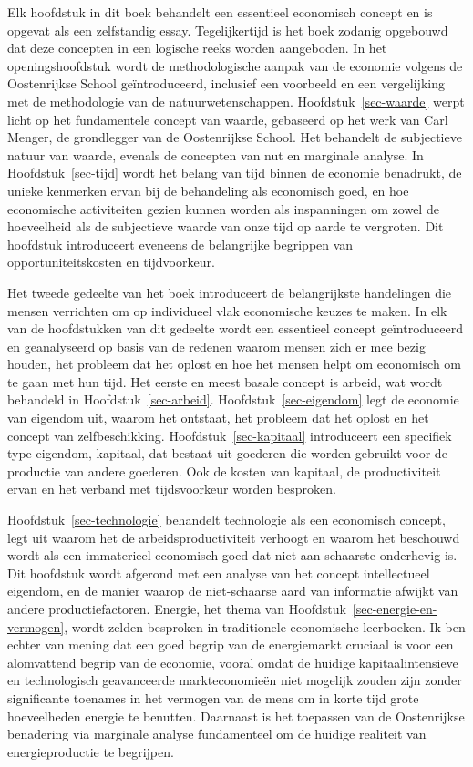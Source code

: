 \documentclass[
  a5paper,
  smalldemyvopaper,11pt,twoside,onecolumn,openright,extrafontsizes,
hidelinks]{memoir}
\begin{document}
Elk hoofdstuk in dit boek behandelt een essentieel economisch concept en
is opgevat als een zelfstandig essay. Tegelijkertijd is het boek zodanig
opgebouwd dat deze concepten in een logische reeks worden aangeboden. In
het openingshoofdstuk wordt de methodologische aanpak van de economie
volgens de Oostenrijkse School geïntroduceerd, inclusief een voorbeeld
en een vergelijking met de methodologie van de natuurwetenschappen.
Hoofdstuk~\ref{sec-waarde} werpt licht op het fundamentele concept van
waarde, gebaseerd op het werk van Carl Menger, de grondlegger van de
Oostenrijkse School. Het behandelt de subjectieve natuur van waarde,
evenals de concepten van nut en marginale analyse. In
Hoofdstuk~\ref{sec-tijd} wordt het belang van tijd binnen de economie
benadrukt, de unieke kenmerken ervan bij de behandeling als economisch
goed, en hoe economische activiteiten gezien kunnen worden als
inspanningen om zowel de hoeveelheid als de subjectieve waarde van onze
tijd op aarde te vergroten. Dit hoofdstuk introduceert eveneens de
belangrijke begrippen van opportuniteitskosten en tijdvoorkeur.

Het tweede gedeelte van het boek introduceert de belangrijkste
handelingen die mensen verrichten om op individueel vlak economische
keuzes te maken. In elk van de hoofdstukken van dit gedeelte wordt een
essentieel concept geïntroduceerd en geanalyseerd op basis van de
redenen waarom mensen zich er mee bezig houden, het probleem dat het
oplost en hoe het mensen helpt om economisch om te gaan met hun tijd.
Het eerste en meest basale concept is arbeid, wat wordt behandeld in
Hoofdstuk~\ref{sec-arbeid}. Hoofdstuk~\ref{sec-eigendom} legt de
economie van eigendom uit, waarom het ontstaat, het probleem dat het
oplost en het concept van zelfbeschikking. Hoofdstuk~\ref{sec-kapitaal}
introduceert een specifiek type eigendom, kapitaal, dat bestaat uit
goederen die worden gebruikt voor de productie van andere goederen. Ook
de kosten van kapitaal, de productiviteit ervan en het verband met
tijdsvoorkeur worden besproken.

Hoofdstuk~\ref{sec-technologie} behandelt technologie als een economisch
concept, legt uit waarom het de arbeidsproductiviteit verhoogt en waarom
het beschouwd wordt als een immaterieel economisch goed dat niet aan
schaarste onderhevig is. Dit hoofdstuk wordt afgerond met een analyse
van het concept intellectueel eigendom, en de manier waarop de
niet-schaarse aard van informatie afwijkt van andere productiefactoren.
Energie, het thema van Hoofdstuk~\ref{sec-energie-en-vermogen}, wordt
zelden besproken in traditionele economische leerboeken. Ik ben echter
van mening dat een goed begrip van de energiemarkt cruciaal is voor een
alomvattend begrip van de economie, vooral omdat de huidige
kapitaalintensieve en technologisch geavanceerde markteconomieën niet
mogelijk zouden zijn zonder significante toenames in het vermogen van de
mens om in korte tijd grote hoeveelheden energie te benutten. Daarnaast
is het toepassen van de Oostenrijkse benadering via marginale analyse
fundamenteel om de huidige realiteit van energieproductie te begrijpen.
\end{document}
